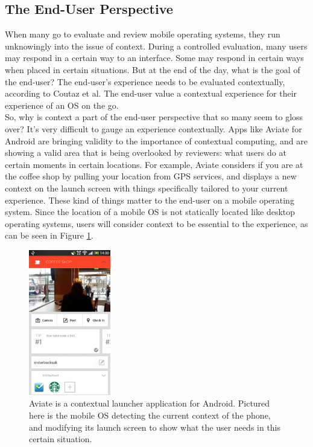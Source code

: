 \documentclass[11pt]{article}
\begin{document}
\subsection{The End-User Perspective}
When many go to evaluate and review mobile operating systems, they run unknowingly into the issue of context. During a controlled evaluation, many users may respond in a certain way to an interface. Some may respond in certain ways when placed in certain situations. But at the end of the day, what is the goal of the end-user? The end-user's experience needs to be evaluated contextually, according to Coutaz et al. The end-user value a contextual experience for their experience of an OS on the go. \cite{Coutaz} \\
\indent So, why is context a part of the end-user perspective that so many seem to gloss over? It's very difficult to gauge an experience contextually. Apps like Aviate for Android are bringing validity to the importance of contextual computing, and are showing a valid area that is being overlooked by reviewers: what users do at certain moments in certain locations. For example, Aviate considers if you are at the coffee shop by pulling your location from GPS services, and displays a new context on the launch screen with things specifically tailored to your current experience. \cite{Aviate} These kind of things matter to the end-user on a mobile operating system. Since the location of a mobile OS is not statically located like desktop operating systems, users will consider context to be essential to the experience, as can be seen in Figure \ref{aviate}.

\begin{figure}[h]
\begin{center}
\includegraphics[height = 2.5in]{aviate}
\caption{Aviate is a contextual launcher application for Android. Pictured here is the mobile OS detecting the current context of the phone, and modifying its launch screen to show what the user needs in this certain situation. \cite{Aviate}}
\label{aviate}
\end{center}
\end{figure}
\end{document}
